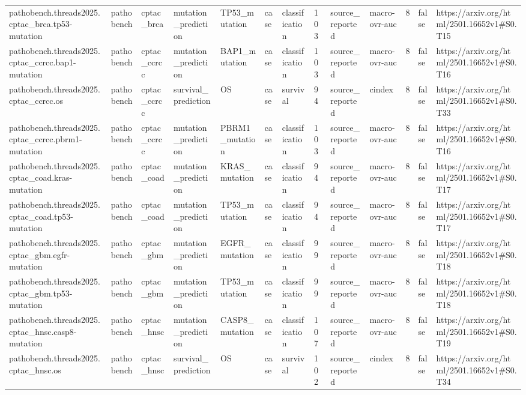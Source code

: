 \begin{longtable}{lllllllllllll}
pathobench.threads2025.cptac\_brca.tp53-mutation & pathobench & cptac\_brca & mutation\_prediction & TP53\_mutation & case & classification & 103 & source\_reported & macro-ovr-auc & 8 & false & https://arxiv.org/html/2501.16652v1\#S0.T15 \\
pathobench.threads2025.cptac\_ccrcc.bap1-mutation & pathobench & cptac\_ccrcc & mutation\_prediction & BAP1\_mutation & case & classification & 103 & source\_reported & macro-ovr-auc & 8 & false & https://arxiv.org/html/2501.16652v1\#S0.T16 \\
pathobench.threads2025.cptac\_ccrcc.os & pathobench & cptac\_ccrcc & survival\_prediction & OS & case & survival & 94 & source\_reported & cindex & 8 & false & https://arxiv.org/html/2501.16652v1\#S0.T33 \\
pathobench.threads2025.cptac\_ccrcc.pbrm1-mutation & pathobench & cptac\_ccrcc & mutation\_prediction & PBRM1\_mutation & case & classification & 103 & source\_reported & macro-ovr-auc & 8 & false & https://arxiv.org/html/2501.16652v1\#S0.T16 \\
pathobench.threads2025.cptac\_coad.kras-mutation & pathobench & cptac\_coad & mutation\_prediction & KRAS\_mutation & case & classification & 94 & source\_reported & macro-ovr-auc & 8 & false & https://arxiv.org/html/2501.16652v1\#S0.T17 \\
pathobench.threads2025.cptac\_coad.tp53-mutation & pathobench & cptac\_coad & mutation\_prediction & TP53\_mutation & case & classification & 94 & source\_reported & macro-ovr-auc & 8 & false & https://arxiv.org/html/2501.16652v1\#S0.T17 \\
pathobench.threads2025.cptac\_gbm.egfr-mutation & pathobench & cptac\_gbm & mutation\_prediction & EGFR\_mutation & case & classification & 99 & source\_reported & macro-ovr-auc & 8 & false & https://arxiv.org/html/2501.16652v1\#S0.T18 \\
pathobench.threads2025.cptac\_gbm.tp53-mutation & pathobench & cptac\_gbm & mutation\_prediction & TP53\_mutation & case & classification & 99 & source\_reported & macro-ovr-auc & 8 & false & https://arxiv.org/html/2501.16652v1\#S0.T18 \\
pathobench.threads2025.cptac\_hnsc.casp8-mutation & pathobench & cptac\_hnsc & mutation\_prediction & CASP8\_mutation & case & classification & 107 & source\_reported & macro-ovr-auc & 8 & false & https://arxiv.org/html/2501.16652v1\#S0.T19 \\
pathobench.threads2025.cptac\_hnsc.os & pathobench & cptac\_hnsc & survival\_prediction & OS & case & survival & 102 & source\_reported & cindex & 8 & false & https://arxiv.org/html/2501.16652v1\#S0.T34 \\

\end{longtable}
